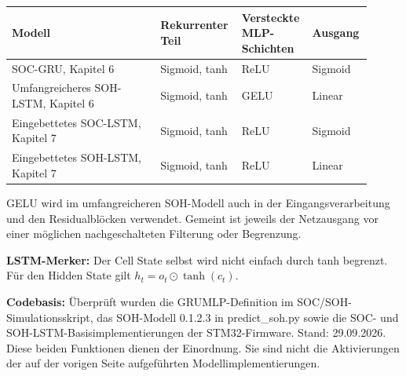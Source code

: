 \begingroup\small\setlength{\tabcolsep}{4pt}
\begin{tabular}{@{}p{0.40\linewidth}p{0.21\linewidth}p{0.15\linewidth}p{0.15\linewidth}@{}}
\toprule Modell & Rekurrenter Teil & Versteckte MLP-Schichten & Ausgang\\\midrule
SOC-GRU, Kapitel 6 & Sigmoid, tanh & ReLU & Sigmoid\\[5pt]
Umfangreicheres SOH-LSTM, Kapitel 6 & Sigmoid, tanh & GELU & Linear\\[5pt]
Eingebettetes SOC-LSTM, Kapitel 7 & Sigmoid, tanh & ReLU & Sigmoid\\[5pt]
Eingebettetes SOH-LSTM, Kapitel 7 & Sigmoid, tanh & ReLU & Linear\\\bottomrule
\end{tabular}\endgroup

GELU wird im umfangreicheren SOH-Modell auch in der Eingangsverarbeitung und den Residualblöcken verwendet. Gemeint ist jeweils der Netzausgang vor einer möglichen nachgeschalteten Filterung oder Begrenzung.

\textbf{LSTM-Merker:} Der Cell State selbst wird nicht einfach durch tanh begrenzt. Für den Hidden State gilt $h_t=o_t\odot\tanh(c_t)$.

\textbf{Codebasis:} Überprüft wurden die GRUMLP-Definition im SOC/SOH-Simulationsskript, das SOH-Modell 0.1.2.3 in predict\_soh.py sowie die SOC- und SOH-LSTM-Basisimplementierungen der STM32-Firmware. Stand: 29.09.2026.
\clearpage
{}
Diese beiden Funktionen dienen der Einordnung. Sie sind nicht die Aktivierungen der auf der vorigen Seite aufgeführten Modellimplementierungen.

